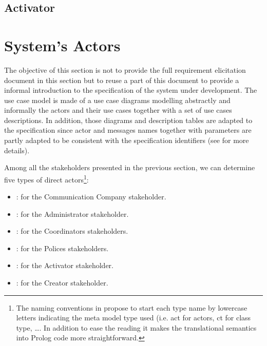 \subsection{Activator}


\newpage

\section{System's Actors}
\label{sec:lu.uni.lassy.excalibur.examples.icrash-gendescr-actors}


The objective of this section is not to provide the full requirement elicitation document in this section but to reuse a part of this document to provide a informal introduction to the \msrmessir specification of the system under development. The use case model is made of a use case diagrams modelling abstractly and informally the actors and their use cases together with a set of use cases descriptions. 
In addition, those diagrams and description tables are adapted to the \msrmessir specification since actor and messages names together with parameters are partly adapted to be consistent with the specification identifiers (see \cite{messirbook} for more details). 

Among all the stakeholders presented in the previous section, we can determine five types of \glspl{direct actor}\footnote{The naming conventions in \msrmessir propose to start each type name by lowercase letters indicating the meta model type used (i.e. act for actors, ct for class type, \ldots. In addition to ease the reading it makes the translational semantics into Prolog code more straightforward.}: 
\begin{itemize}
  \item {}: for the Communication Company stakeholder.
  \item {}: for the Administrator stakeholder.
  \item {}: for the Coordinators stakeholders.
  \item {}: for the Polices stakeholders.
  \item {}: for the Activator stakeholder.
  \item {}: for the Creator stakeholder.
\end{itemize}
 
